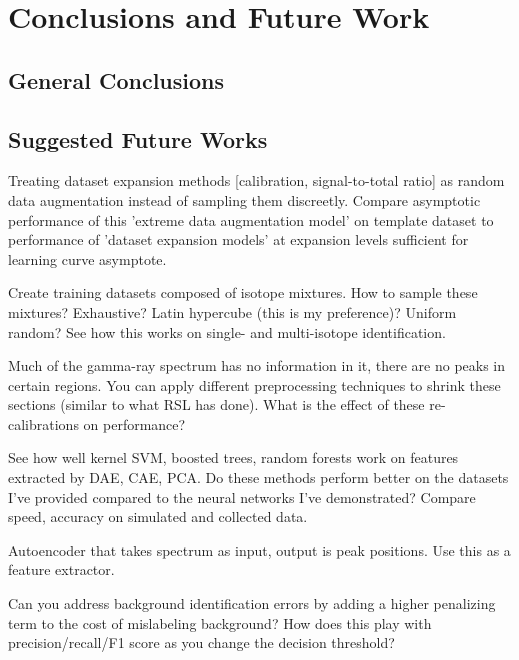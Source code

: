 \chapter{Conclusions and Future Work}

\section{General Conclusions}


\section{Suggested Future Works}


Treating dataset expansion methods [calibration, signal-to-total ratio] as random data augmentation instead of sampling them discreetly. Compare asymptotic performance of this 'extreme data augmentation model' on template dataset to performance of 'dataset expansion models' at expansion levels sufficient for learning curve asymptote. 

Create training datasets composed of isotope mixtures. How to sample these mixtures? Exhaustive? Latin hypercube (this is my preference)? Uniform random? See how this works on single- and multi-isotope identification.


Much of the gamma-ray spectrum has no information in it, there are no peaks in certain regions. You can apply different preprocessing techniques to shrink these sections (similar to what RSL has done). What is the effect of these re-calibrations on performance?

See how well kernel SVM, boosted trees, random forests work on features extracted by DAE, CAE, PCA. Do these methods perform better on the datasets I've provided compared to the neural networks I've demonstrated? Compare speed, accuracy on simulated and collected data.

Autoencoder that takes spectrum as input, output is peak positions. Use this as a feature extractor. 

Can you address background identification errors by adding a higher penalizing term to the cost of mislabeling background? How does this play with precision/recall/F1 score as you change the decision threshold?
